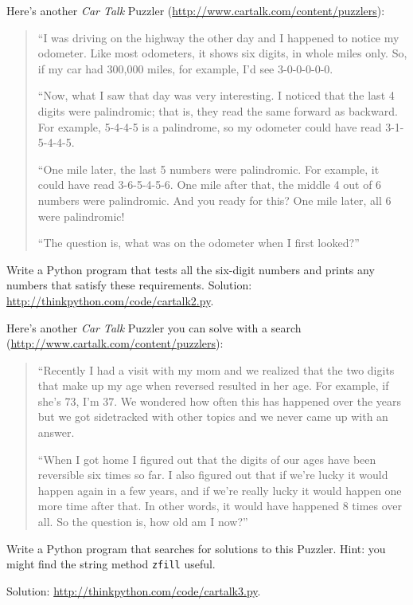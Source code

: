 \documentclass[10pt]{book}
\begin{document}
\begin{exercise}
Here's another {\em Car Talk}
Puzzler (\url{http://www.cartalk.com/content/puzzlers}):

\begin{quote}
``I was driving on the highway the other day and I happened to
notice my odometer. Like most odometers, it shows six digits,
in whole miles only. So, if my car had 300,000
miles, for example, I'd see 3-0-0-0-0-0.

``Now, what I saw that day was very interesting. I noticed that the
last 4 digits were palindromic; that is, they read the same forward as
backward. For example, 5-4-4-5 is a palindrome, so my odometer
could have read 3-1-5-4-4-5.

``One mile later, the last 5 numbers were palindromic. For example, it
could have read 3-6-5-4-5-6.  One mile after that, the middle 4 out of
6 numbers were palindromic.  And you ready for this? One mile later,
all 6 were palindromic!

``The question is, what was on the odometer when I first looked?''
\end{quote}

Write a Python program that tests all the six-digit numbers and prints
any numbers that satisfy these requirements.  
Solution: \url{http://thinkpython.com/code/cartalk2.py}.

\end{exercise}


\begin{exercise}
Here's another {\em Car Talk} Puzzler you can solve with a
search (\url{http://www.cartalk.com/content/puzzlers}):

\begin{quote}
``Recently I had a visit with my mom and we realized that
the two digits that make up my age when reversed resulted in her
age. For example, if she's 73, I'm 37. We wondered how often this has
happened over the years but we got sidetracked with other topics and
we never came up with an answer.

``When I got home I figured out that the digits of our ages have been
reversible six times so far. I also figured out that if we're lucky it
would happen again in a few years, and if we're really lucky it would
happen one more time after that. In other words, it would have
happened 8 times over all. So the question is, how old am I now?''

\end{quote}

Write a Python program that searches for solutions to this Puzzler.
Hint: you might find the string method {\tt zfill} useful.

Solution: \url{http://thinkpython.com/code/cartalk3.py}.

\end{exercise}
\end{document}
